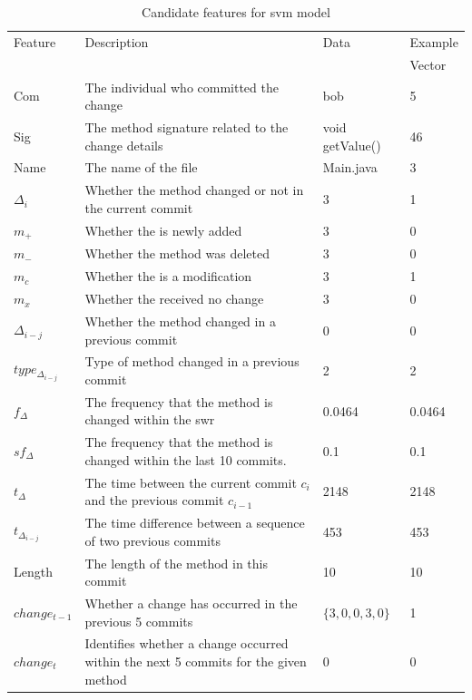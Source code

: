 \begin{table}
\begin{center}
    \begin{tabularx}{\linewidth}{|l|X|l|l|}
        \hline
        Feature & Description & Data & Example \\
         & & & Vector \\
        \hline
        Com & The individual who committed the change & bob & 5 \\ \hline
        Sig & The method signature related to the change details & void getValue() & 46\\ \hline
        Name & The name of the file & Main.java & 3 \\ \hline
        $\Delta_i$ & Whether the method changed or not in the current commit & 3 & 1 \\ \hline 

        $m_+$ & Whether the is newly added & 3 & 0 \\ \hline
        $m_-$ & Whether the method was deleted & 3 & 0 \\ \hline
        $m_c$ & Whether the is a modification & 3 & 1 \\ \hline
        $m_x$ & Whether the received no change & 3 & 0 \\ \hline

        $\Delta_{i-j}$ & Whether the method changed in a previous commit & 0 & 0 \\ \hline

        $type_{\Delta_{i-j}}$ & Type of method changed in a previous commit & 2 & 2 \\ \hline
        
        $f_{\Delta}$ & The frequency that the method is changed within the \gls{swr} & 0.0464 & 0.0464 \\ \hline
        $sf_{\Delta}$ & The frequency that the method is changed within the last 10 commits.  & 0.1 & 0.1 \\ \hline
        $t_\Delta$ & The time between the current commit $c_i$ and the previous commit $c_{i-1}$ & 2148 & 2148 \\ \hline

        $t_{\Delta_{i-j}}$ & The time difference between a sequence of two previous commits & 453 & 453 \\ \hline

        Length & The length of the method in this commit & 10 & 10 \\ \hline
        $change_{t-1}$ & Whether a change has occurred in the previous 5 commits & $\{3, 0, 0, 3, 0\}$ & 1 \\
        \hline
        $change_{t}$ & Identifies whether a change occurred within the next 5 commits for the given method & 0 & 0\\
        \hline
    \end{tabularx}
\end{center}
    \caption{Candidate features for \gls{svm} model}
    \label{tab:candidate_features}
\end{table}


